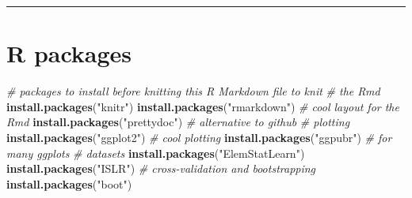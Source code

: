 \documentclass[]{article}
\newenvironment{Shaded}{\begin{snugshade}}{\end{snugshade}}
\newcommand{\CommentTok}[1]{\textcolor[rgb]{0.56,0.35,0.01}{\textit{#1}}}
\newcommand{\KeywordTok}[1]{\textcolor[rgb]{0.13,0.29,0.53}{\textbf{#1}}}
\newcommand{\NormalTok}[1]{#1}
\newcommand{\StringTok}[1]{\textcolor[rgb]{0.31,0.60,0.02}{#1}}
\begin{document}
\begin{center}\rule{0.5\linewidth}{\linethickness}\end{center}

\hypertarget{r-packages}{%
\section{ R packages}\label{r-packages}}

\footnotesize

\begin{Shaded}
\begin{Highlighting}[]
\CommentTok{# packages to install before knitting this R Markdown file to knit}
\CommentTok{# the Rmd}
\KeywordTok{install.packages}\NormalTok{(}\StringTok{"knitr"}\NormalTok{)}
\KeywordTok{install.packages}\NormalTok{(}\StringTok{"rmarkdown"}\NormalTok{)}
\CommentTok{# cool layout for the Rmd}
\KeywordTok{install.packages}\NormalTok{(}\StringTok{"prettydoc"}\NormalTok{)  }\CommentTok{# alternative to github}
\CommentTok{# plotting}
\KeywordTok{install.packages}\NormalTok{(}\StringTok{"ggplot2"}\NormalTok{)  }\CommentTok{# cool plotting}
\KeywordTok{install.packages}\NormalTok{(}\StringTok{"ggpubr"}\NormalTok{)  }\CommentTok{# for many ggplots}
\CommentTok{# datasets}
\KeywordTok{install.packages}\NormalTok{(}\StringTok{"ElemStatLearn"}\NormalTok{)}
\KeywordTok{install.packages}\NormalTok{(}\StringTok{"ISLR"}\NormalTok{)}
\CommentTok{# cross-validation and bootstrapping}
\KeywordTok{install.packages}\NormalTok{(}\StringTok{"boot"}\NormalTok{)}
\end{Highlighting}
\end{Shaded}
\end{document}
